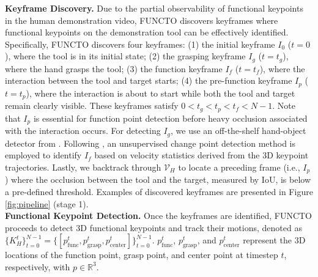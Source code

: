 \noindent \textbf{Keyframe Discovery.} Due to the partial observability of functional keypoints in the human demonstration video, FUNCTO discovers keyframes where functional keypoints on the demonstration tool can be effectively identified. Specifically, FUNCTO discovers four keyframes: (1) the initial keyframe $I_0$ ($t=0$), where the tool is in its initial state; (2) the grasping keyframe $I_g$ ($t=t_g$), where the hand grasps the tool; (3) the function keyframe $I_f$ ($t=t_f$), where the interaction between the tool and target starts; (4) the pre-function keyframe $I_{p}$ ($t=t_{p}$), where the interaction is about to start while both the tool and target remain clearly visible. These keyframes satisfy $0 < t_g < t_p < t_f < N-1$. Note that $I_{p}$ is essential for function point detection before heavy occlusion associated with the interaction occurs. For detecting $I_g$, we use an off-the-shelf hand-object detector from \cite{shan2020understanding}. Following \cite{zhu2024vision}, an unsupervised change point detection method \cite{killick2012optimal} is employed to identify $I_f$ based on velocity statistics derived from the 3D keypoint trajectories. Lastly, we backtrack through $\mathcal{V}_H$ to locate a preceding frame (i.e., $I_{p}$) where the occlusion between the tool and the target, measured by IoU, is below a pre-defined threshold. Examples of discovered keyframes are presented in Figure \ref{fig:pipeline} (stage 1).\\

\noindent \textbf{Functional Keypoint Detection.} Once the keyframes are identified, FUNCTO proceeds to detect 3D functional keypoints and track their motions, denoted as $\{K_H^t\}_{t=0}^{N-1} = \{[p_{\text{func}}^t, p_{\text{grasp}}^t, p_{\text{center}}^t]\}_{t=0}^{N-1}$. $p_{\text{func}}^t$, $p_{\text{grasp}}^t$, and $p_{\text{center}}^t$ represent the 3D locations of the function point, grasp point, and center point at timestep $t$, respectively, with $p \in \mathbb{R}^3$.


